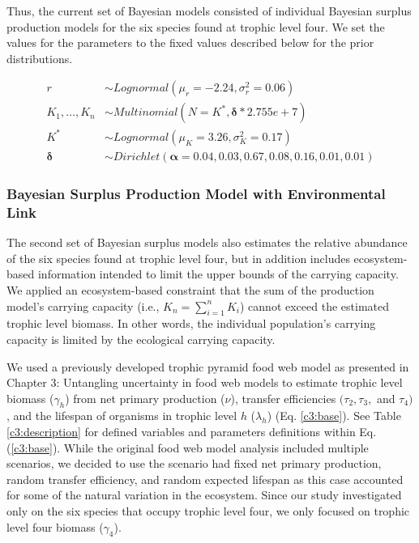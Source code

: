 \documentclass[oneside,12pt,final]{sty/ucthesis-CA2012}
\begin{document}
\begin{mainmatter}
\vspace{5mm}

Thus, the current set of Bayesian models consisted of individual Bayesian surplus production models for the six species found at trophic level four. We set the values for the parameters to the fixed values described below for the prior distributions.

\begin{align*}
r & \sim Lognormal(\mu_r = -2.24, \sigma_r^2 = 0.06) \\
K_1,\dots,K_n & \sim Multinomial(N=K^*, \boldsymbol{\delta}*2.755e+7) \\
K^* & \sim Lognormal(\mu_K = 3.26, \sigma_K^2 = 0.17)  \\
\boldsymbol{\delta} & \sim Dirichlet(\boldsymbol{\alpha}=0.04, 0.03, 0.67, 0.08, 0.16, 0.01, 0.01)
\end{align*}

\subsubsection*{Bayesian Surplus Production Model with Environmental Link}
The second set of Bayesian surplus models also estimates the relative abundance of the six species found at trophic level four, but in addition includes ecosystem-based information intended to limit the upper bounds of the carrying capacity. We applied an ecosystem-based constraint that the sum of the production model's carrying capacity (i.e., $K_n = \sum_{i=1}^{n} K_i$) cannot exceed the estimated trophic level biomass. In other words, the individual population's carrying capacity is limited by the ecological carrying capacity.

\vspace{5mm}

We used a previously developed trophic pyramid food web model as presented in Chapter 3: Untangling uncertainty in food web models to estimate trophic level biomass ($\gamma_h$) from net primary production ($\nu$), transfer efficiencies $(\tau_2, \tau_3,$ and $\tau_4)$, and the lifespan of organisms in trophic level $h$ ($\lambda_h$) (Eq. \ref{c3:base}). See Table \ref{c3:description} for defined variables and parameters definitions within Eq. (\ref{c3:base}). While the original food web model analysis included multiple scenarios, we decided to use the scenario had fixed net primary production, random transfer efficiency, and random expected lifespan as this case accounted for some of the natural variation in the ecosystem. Since our study investigated only on the six species that occupy trophic level four, we only focused on trophic level four biomass ($\gamma_4$). 


\end{mainmatter}
\end{document}
